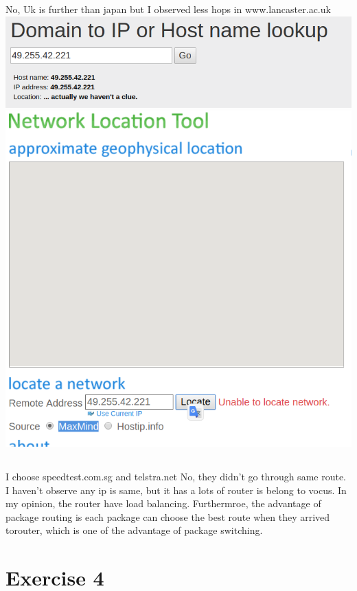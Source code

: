 \documentclass{article}
\begin{document}
No, Uk is further than japan but I observed less hops in www.lancaster.ac.uk
\includegraphics[width=\textwidth]{Location_wont_work.png}
\includegraphics[width=\textwidth]{Location_wont_work2.png}

\subsection{}
I choose speedtest.com.sg and telstra.net
No, they  didn't go through same  route. I haven't observe any ip is same, but it has a lots of router is belong to vocus. In my opinion, the router have load balancing. Furthermroe, the advantage of package routing is each package can choose the best route when they arrived torouter, which is one of the advantage of package switching. 

\section{Exercise 4}
\end{document}
